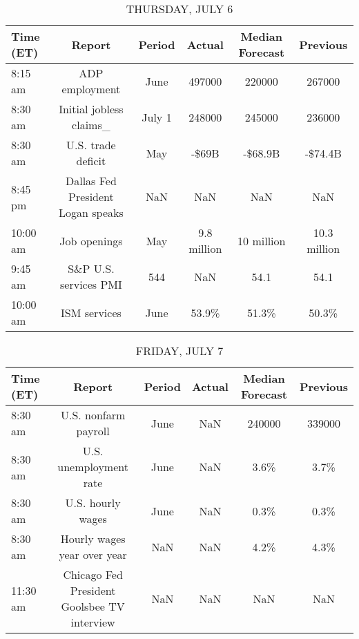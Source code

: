 \documentclass{article}%
\begin{document}
%


\begin{table}[htbp]%
\caption{THURSDAY, JULY 6}%
\centering%
\begin{adjustbox}{width=1\textwidth}%
\begin{tabular}{lccccc}
\toprule
Time (ET) &                            Report & Period &      Actual & Median Forecast &     Previous \\
\midrule
  8:15 am &                    ADP employment &   June &      497000 &          220000 &       267000 \\
  8:30 am &           Initial jobless claims\_ & July 1 &      248000 &          245000 &       236000 \\
  8:30 am &                U.S. trade deficit &    May &       -\$69B &         -\$68.9B &      -\$74.4B \\
  8:45 pm & Dallas Fed President Logan speaks &    NaN &         NaN &             NaN &          NaN \\
 10:00 am &                      Job openings &    May & 9.8 million &      10 million & 10.3 million \\
  9:45 am &             S\&P U.S. services PMI &    544 &         NaN &            54.1 &         54.1 \\
 10:00 am &                      ISM services &   June &       53.9\% &           51.3\% &        50.3\% \\
\bottomrule
\end{tabular}
%
\end{adjustbox}%
\end{table}

%


\begin{table}[htbp]%
\caption{FRIDAY, JULY 7}%
\centering%
\begin{adjustbox}{width=1\textwidth}%
\begin{tabular}{lccccc}
\toprule
Time (ET) &                                      Report & Period & Actual & Median Forecast & Previous \\
\midrule
  8:30 am &                        U.S. nonfarm payroll &   June &    NaN &          240000 &   339000 \\
  8:30 am &                      U.S. unemployment rate &   June &    NaN &            3.6\% &     3.7\% \\
  8:30 am &                           U.S. hourly wages &   June &    NaN &            0.3\% &     0.3\% \\
  8:30 am &                 Hourly wages year over year &    NaN &    NaN &            4.2\% &     4.3\% \\
 11:30 am & Chicago Fed President Goolsbee TV interview &    NaN &    NaN &             NaN &      NaN \\
\bottomrule
\end{tabular}
%
\end{adjustbox}%
\end{table}
\end{document}
